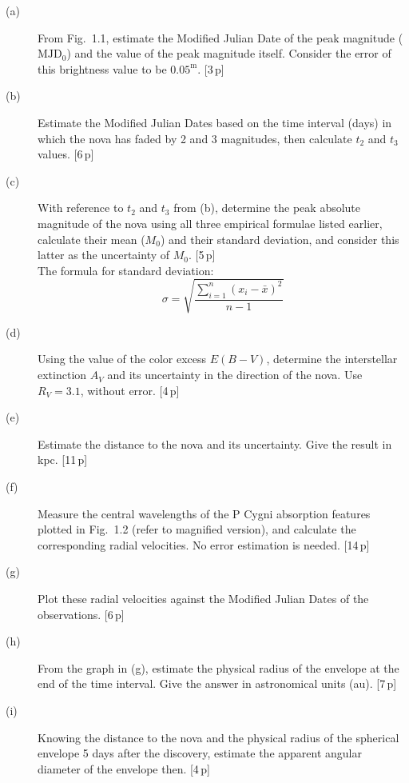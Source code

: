 \begin{description}
\item[(a)] From Fig.~1.1, estimate the Modified Julian Date of the peak
  magnitude ($\mathrm{MJD}_0$) and the value of the peak magnitude itself.
  Consider the error of this brightness value to be $0.05^{\mathrm{m}}$.
  \hfill[3\,p]
\item[(b)] Estimate the Modified Julian Dates based on the time interval
  (days) in which the nova has faded by 2 and 3 magnitudes, then calculate
  $t_2$ and $t_3$ values. \hfill[6\,p]
\item[(c)] With reference to $t_2$ and $t_3$ from (b), determine the peak
  absolute magnitude of the nova using all three empirical formulae listed
  earlier, calculate their mean ($M_0$) and their standard deviation, and
  consider this latter as the uncertainty of $M_0$. \hfill[5\,p] \\
  The formula for standard deviation:
  \[ \sigma = \sqrt{\frac{\sum_{i=1}^{n}(x_i - \bar{x})^2}{n-1}} \]
\item[(d)] Using the value of the color excess $E(B-V)$, determine the
  interstellar extinction $A_V$ and its uncertainty in the direction of the
  nova. Use $R_V = 3.1$, without error. \hfill[4\,p]
\item[(e)] Estimate the distance to the nova and its uncertainty. Give the
  result in kpc. \hfill[11\,p]
\item[(f)] Measure the central wavelengths of the P Cygni absorption
  features plotted in Fig.~1.2 (refer to magnified version), and calculate
  the corresponding radial velocities. No error estimation is needed.
  \hfill[14\,p]
\item[(g)] Plot these radial velocities against the Modified Julian Dates of
  the observations. \hfill[6\,p]
\item[(h)] From the graph in (g), estimate the physical radius of the
  envelope at the end of the time interval. Give the answer in astronomical
  units (au). \hfill[7\,p]
\item[(i)] Knowing the distance to the nova and the physical radius of the
  spherical envelope 5 days after the discovery, estimate the apparent
  angular diameter of the envelope then. \hfill[4\,p]
\end{description}
